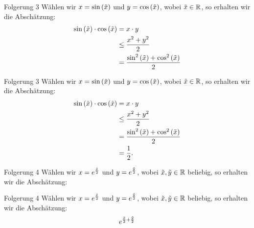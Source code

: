 \documentclass[10pt]{beamer}
\def\bR{\mathbb{R}}
\begin{document}
\begin{frame}{Folgerung 3}
    Wählen wir \( x = \sin\left( \Tilde{x} \right) \) und \( y = \cos\left( \Tilde{x} \right) \), wobei \( \Tilde{x} \in \bR \), so erhalten wir die Abschätzung:
    \begin{align*}
        \sin\left( \Tilde{x} \right) \cdot \cos\left( \Tilde{x} \right)
        & = x \cdot y \\
        & \leq \frac{x^{2} + y^{2}}{2} \\ 
        & = \frac{\sin^{2}\left( \Tilde{x} \right) + \cos^{2}\left( \Tilde{x} \right)}{2} \\
    \end{align*}
\end{frame}



\begin{frame}{Folgerung 3}
    Wählen wir \( x = \sin\left( \Tilde{x} \right) \) und \( y = \cos\left( \Tilde{x} \right) \), wobei \( \Tilde{x} \in \bR \), so erhalten wir die Abschätzung:
    \begin{align*}
        \sin\left( \Tilde{x} \right) \cdot \cos\left( \Tilde{x} \right)
        & = x \cdot y \\
        & \leq \frac{x^{2} + y^{2}}{2} \\ 
        & = \frac{\sin^{2}\left( \Tilde{x} \right) + \cos^{2}\left( \Tilde{x} \right)}{2} \\
        & = \frac{1}{2}.
    \end{align*}
\end{frame}



\begin{frame}{Folgerung 4}
    Wählen wir \( x = e^{\frac{\Tilde{x}}{2}} \) und \( y = e^{\frac{\Tilde{y}}{2}} \), wobei \( \Tilde{x}, \Tilde{y} \in \bR \) beliebig, so erhalten wir die Abschätzung: 
\end{frame}



\begin{frame}{Folgerung 4}
    Wählen wir \( x = e^{\frac{\Tilde{x}}{2}} \) und \( y = e^{\frac{\Tilde{y}}{2}} \), wobei \( \Tilde{x}, \Tilde{y} \in \bR \) beliebig, so erhalten wir die Abschätzung:
    \begin{align*}
        e^{\frac{\Tilde{x}}{2} + \frac{\Tilde{y}}{2}}
    \end{align*}
\end{frame}
\end{document}
